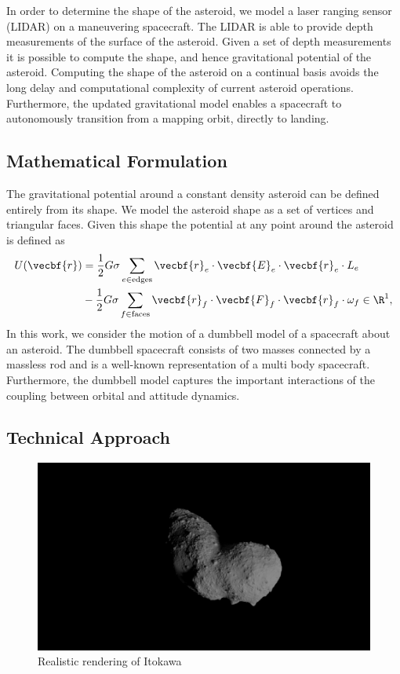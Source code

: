 \documentclass[11pt,reqno,twocolumn]{article} %
\begin{document}
In order to determine the shape of the asteroid, we model a laser ranging sensor (LIDAR) on a maneuvering spacecraft.
The LIDAR is able to provide depth measurements of the surface of the asteroid.
Given a set of depth measurements it is possible to compute the shape, and hence gravitational potential of the asteroid.
Computing the shape of the asteroid on a continual basis avoids the long delay and computational complexity of current asteroid operations.
Furthermore, the updated gravitational model enables a spacecraft to autonomously transition from a mapping orbit, directly to landing.

\subsection*{Mathematical Formulation}\label{se:mathematical_problem}
The gravitational potential around a constant density asteroid can be defined entirely from its shape.
We model the asteroid shape as a set of vertices and triangular faces.
Given this shape the potential at any point around the asteroid is defined as
\begin{align}\label{eq:potential}
    U(\vecbf{r}) &= \frac{1}{2} G \sigma \sum_{e \in \text{edges}} \vecbf{r}_e \cdot \vecbf{E}_e \cdot \vecbf{r}_e \cdot L_e \nonumber\\
                 &- \frac{1}{2}G \sigma \sum_{f \in \text{faces}} \vecbf{r}_f \cdot \vecbf{F}_f \cdot \vecbf{r}_f \cdot \omega_f \in \R^1,
\end{align}
In this work, we consider the motion of a dumbbell model of a spacecraft about an asteroid.
The dumbbell spacecraft consists of two masses connected by a massless rod and is a well-known representation of a multi body spacecraft.
Furthermore, the dumbbell model captures the important interactions of the coupling between orbital and attitude dynamics. 

\subsection*{Technical Approach}

\begin{figure}
    \centering
    \includegraphics[width=\columnwidth,trim={50mm 30mm 50mm 30mm},clip]{figures/itokawa_blender.png}
    \caption{Realistic rendering of Itokawa}
\end{figure}
\end{document}
